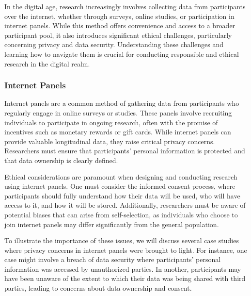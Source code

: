 \documentclass[
]{book}
\begin{document}
In the digital age, research increasingly involves collecting data from participants over the internet, whether through surveys, online studies, or participation in internet panels. While this method offers convenience and access to a broader participant pool, it also introduces significant ethical challenges, particularly concerning privacy and data security. Understanding these challenges and learning how to navigate them is crucial for conducting responsible and ethical research in the digital realm.

\subsubsection{Internet Panels}\label{internet-panels}

Internet panels are a common method of gathering data from participants who regularly engage in online surveys or studies. These panels involve recruiting individuals to participate in ongoing research, often with the promise of incentives such as monetary rewards or gift cards. While internet panels can provide valuable longitudinal data, they raise critical privacy concerns. Researchers must ensure that participants' personal information is protected and that data ownership is clearly defined.

Ethical considerations are paramount when designing and conducting research using internet panels. One must consider the informed consent process, where participants should fully understand how their data will be used, who will have access to it, and how it will be stored. Additionally, researchers must be aware of potential biases that can arise from self-selection, as individuals who choose to join internet panels may differ significantly from the general population.

To illustrate the importance of these issues, we will discuss several case studies where privacy concerns in internet panels were brought to light. For instance, one case might involve a breach of data security where participants' personal information was accessed by unauthorized parties. In another, participants may have been unaware of the extent to which their data was being shared with third parties, leading to concerns about data ownership and consent.
\end{document}
